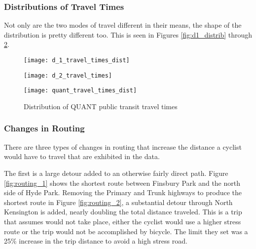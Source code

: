 \subsubsection{Distributions of Travel Times}

Not only are the two modes of travel different in their means, the shape of the distribution is pretty different too. This is seen in Figures \ref{fig:d1_distrib} through \ref{fig:quant_distrib}. 



\begin{figure}
\centering
\begin{minipage}{.5\textwidth}
  \centering
  \texttt{[image: d\_1\_travel\_times\_dist]}
  \label{fig:d1_distrib}
\end{minipage}%
\begin{minipage}{.5\textwidth}
  \centering
  \texttt{[image: d\_2\_travel\_times]}
  \label{fig:d2_distrib}
\end{minipage}
\end{figure}

\begin{figure}
\centering
\texttt{[image: quant\_travel\_times\_dist]}
\caption{Distribution of QUANT public transit travel times}
\label{fig:quant_distrib}
\end{figure}


\subsubsection{Changes in Routing} 

There are three types of changes in routing that increase the distance a cyclist would have to travel that are exhibited in the data. 

The first is a large detour added to an otherwise fairly direct path. Figure \ref{fig:routing_1} shows the shortest route between Finsbury Park and the north side of Hyde Park. Removing the Primary and Trunk highways to produce the shortest route in Figure \ref{fig:routing_2}, a substantial detour through North Kensington is added, nearly doubling the total distance traveled. This is a trip that \cite{furth2016network} assumes would not take place, either the cyclist would use a higher stress route or the trip would not be accomplished by bicycle. The limit they set was a 25\% increase in the trip distance to avoid a high stress road. 

